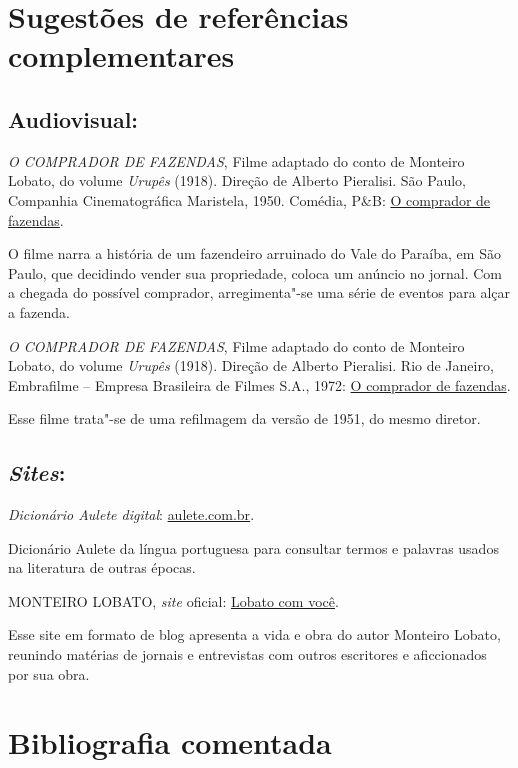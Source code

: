\documentclass[11pt]{extarticle}
\begin{document}
\section{Sugestões de referências complementares}

\subsection{Audiovisual:}

\emph{O COMPRADOR DE FAZENDAS}, Filme adaptado do conto de Monteiro
Lobato, do volume \emph{Urupês} (1918). Direção de Alberto Pieralisi.
São Paulo, Companhia Cinematográfica Maristela, 1950. Comédia, P\&B:
\href{https://www.youtube.com/watch?v=LcdfdfD9_Bs}{O comprador de fazendas}.

O filme narra a história de um fazendeiro arruinado do Vale do Paraíba, em
São Paulo, que decidindo vender sua propriedade, coloca um anúncio no jornal.
Com a chegada do possível comprador, arregimenta"-se uma série de eventos para 
alçar a fazenda. 

\emph{O COMPRADOR DE FAZENDAS}, Filme adaptado do conto de Monteiro
Lobato, do volume \emph{Urupês} (1918). Direção de Alberto Pieralisi.
Rio de Janeiro, Embrafilme -- Empresa Brasileira de Filmes S.A., 1972:
\href{https://www.youtube.com/watch?v=C9OrDOQWm5o}{O comprador de fazendas}.

Esse filme trata"-se de uma refilmagem da versão de 1951, do mesmo 
diretor. 

\subsection{\emph{Sites}:}

\emph{Dicionário Aulete digital}: \href{http://www.aulete.com.br/}{aulete.com.br}.

Dicionário Aulete da língua portuguesa para consultar termos e palavras 
usados na literatura de outras épocas.

MONTEIRO LOBATO, \emph{site} oficial:
\href{https://lobato.com.vc//}{Lobato com você}.

Esse site em formato de blog apresenta a vida e obra do autor Monteiro Lobato, 
reunindo matérias de jornais e entrevistas com outros escritores e aficcionados 
por sua obra. 

\section{Bibliografia comentada}
\end{document}
